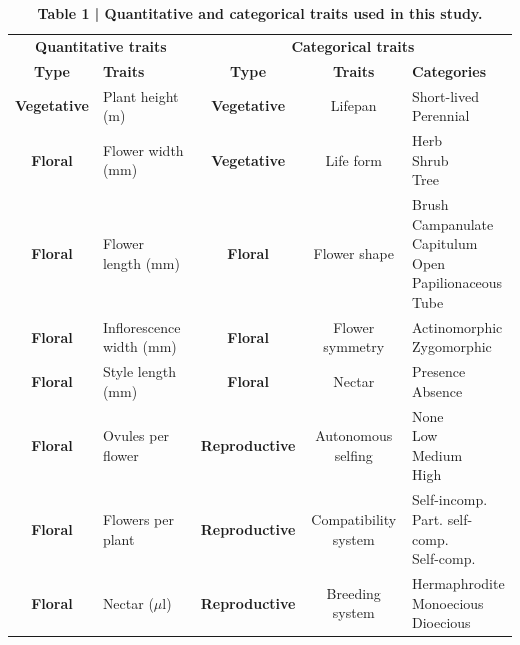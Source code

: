 \documentclass[
  12pt,
  a4paper,
]{article}
\begin{document}
\singlespacing

\begin{table}

\caption{\label{tab:unnamed-chunk-5}\textbf{Table 1 | Quantitative and categorical traits used in this study.}}
\centering
\fontsize{10}{12}\selectfont
\begin{tabular}[t]{>{}cl>{}ccl}
\toprule
\multicolumn{2}{c}{\textbf{Quantitative traits}} & \multicolumn{3}{c}{\textbf{Categorical traits}} \\
\cmidrule(l{3pt}r{3pt}){1-2} \cmidrule(l{3pt}r{3pt}){3-5}
\textbf{Type} & \textbf{Traits} & \textbf{Type} & \textbf{Traits} & \textbf{Categories}\\
\midrule
\textbf{Vegetative} & Plant height (m) & \textbf{Vegetative} & Lifepan & \makecell[l]{Short-lived \\ Perennial}\\
\addlinespace
\textbf{Floral} & Flower width (mm) & \textbf{Vegetative} & Life form & \makecell[l]{Herb \\ Shrub \\ Tree}\\
\addlinespace
\textbf{Floral} & Flower length (mm) & \textbf{Floral} & Flower shape & \makecell[l]{Brush \\ Campanulate \\ Capitulum \\ Open \\ Papilionaceous \\ Tube}\\
\addlinespace
\textbf{Floral} & Inflorescence width (mm) & \textbf{Floral} & Flower symmetry & \makecell[l]{Actinomorphic \\ Zygomorphic}\\
\addlinespace
\textbf{Floral} & Style length (mm) & \textbf{Floral} & Nectar & \makecell[l]{Presence \\ Absence}\\
\addlinespace
\textbf{Floral} & Ovules per flower & \textbf{Reproductive} & Autonomous selfing & \makecell[l]{None \\ Low \\ Medium \\ High}\\
\addlinespace
\textbf{Floral} & Flowers per plant & \textbf{Reproductive} & Compatibility system & \makecell[l]{Self-incomp. \\ Part. self-comp. \\ Self-comp.}\\
\addlinespace
\textbf{Floral} & Nectar ($\mu$l) & \textbf{Reproductive} & Breeding system & \makecell[l]{Hermaphrodite \\ Monoecious \\ Dioecious}\\

\end{tabular}
\end{table}
\end{document}
